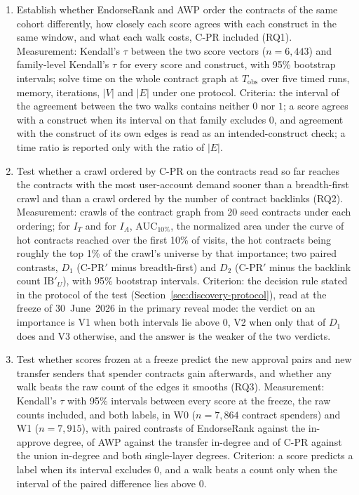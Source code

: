 \begin{enumerate}
\item[O1.] Establish whether EndorseRank and AWP order the contracts of the same cohort differently, how closely each score agrees with each construct in the same window, and what each walk costs, \mbox{C-PR} included (RQ1). Measurement: Kendall's $\tau$ between the two score vectors ($n=6{,}443$) and family-level Kendall's $\tau$ for every score and construct, with 95\% bootstrap intervals; solve time on the whole contract graph at $T_{\mathrm{obs}}$ over five timed runs, memory, iterations, $|V|$ and $|E|$ under one protocol. Criteria: the interval of the agreement between the two walks contains neither $0$ nor $1$; a score agrees with a construct when its interval on that family excludes $0$, and agreement with the construct of its own edges is read as an intended-construct check; a time ratio is reported only with the ratio of $|E|$.
\item[O2.] Test whether a crawl ordered by \mbox{C-PR} on the contracts read so far reaches the contracts with the most user-account demand sooner than a breadth-first crawl and than a crawl ordered by the number of contract backlinks (RQ2). Measurement: crawls of the contract graph from 20 seed contracts under each ordering; for $I_T$ and for $I_A$, $\mathrm{AUC}_{10\%}$, the normalized area under the curve of hot contracts reached over the first 10\% of visits, the hot contracts being roughly the top 1\% of the crawl's universe by that importance; two paired contrasts, $D_1$ (\mbox{C-PR}$'$ minus breadth-first) and $D_2$ (\mbox{C-PR}$'$ minus the backlink count $\mathrm{IB}'_U$), with 95\% bootstrap intervals. Criterion: the decision rule stated in the protocol of the test (Section~\ref{sec:discovery-protocol}), read at the freeze of 30~June~2026 in the primary reveal mode: the verdict on an importance is V1 when both intervals lie above $0$, V2 when only that of $D_1$ does and V3 otherwise, and the answer is the weaker of the two verdicts.
\item[O3.] Test whether scores frozen at a freeze predict the new approval pairs and new transfer senders that spender contracts gain afterwards, and whether any walk beats the raw count of the edges it smooths (RQ3). Measurement: Kendall's $\tau$ with 95\% intervals between every score at the freeze, the raw counts included, and both labels, in W0 ($n=7{,}864$ contract spenders) and W1 ($n=7{,}915$), with paired contrasts of EndorseRank against the in-approve degree, of AWP against the transfer in-degree and of \mbox{C-PR} against the union in-degree and both single-layer degrees. Criterion: a score predicts a label when its interval excludes $0$, and a walk beats a count only when the interval of the paired difference lies above $0$.

\end{enumerate}

